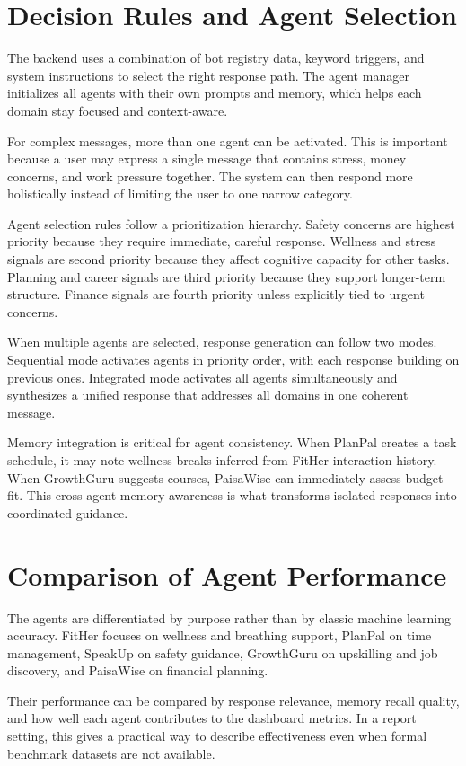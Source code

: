 \documentclass[oneside,a4paper,12pt]{report}
\begin{document}
\section{Decision Rules and Agent Selection}
The backend uses a combination of bot registry data, keyword triggers, and system instructions to select the right response path. The agent manager initializes all agents with their own prompts and memory, which helps each domain stay focused and context-aware.

For complex messages, more than one agent can be activated. This is important because a user may express a single message that contains stress, money concerns, and work pressure together. The system can then respond more holistically instead of limiting the user to one narrow category.

Agent selection rules follow a prioritization hierarchy. Safety concerns are highest priority because they require immediate, careful response. Wellness and stress signals are second priority because they affect cognitive capacity for other tasks. Planning and career signals are third priority because they support longer-term structure. Finance signals are fourth priority unless explicitly tied to urgent concerns.

When multiple agents are selected, response generation can follow two modes. Sequential mode activates agents in priority order, with each response building on previous ones. Integrated mode activates all agents simultaneously and synthesizes a unified response that addresses all domains in one coherent message.

Memory integration is critical for agent consistency. When PlanPal creates a task schedule, it may note wellness breaks inferred from FitHer interaction history. When GrowthGuru suggests courses, PaisaWise can immediately assess budget fit. This cross-agent memory awareness is what transforms isolated responses into coordinated guidance.

\section{Comparison of Agent Performance}
The agents are differentiated by purpose rather than by classic machine learning accuracy. FitHer focuses on wellness and breathing support, PlanPal on time management, SpeakUp on safety guidance, GrowthGuru on upskilling and job discovery, and PaisaWise on financial planning.

Their performance can be compared by response relevance, memory recall quality, and how well each agent contributes to the dashboard metrics. In a report setting, this gives a practical way to describe effectiveness even when formal benchmark datasets are not available.
\end{document}
